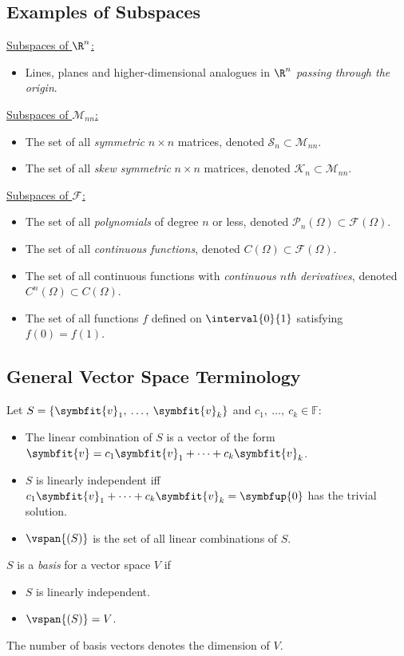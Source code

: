\documentclass{article}
\begin{document}
\begin{multicols*}{3}
    \subsection{Examples of Subspaces}
    \underline{Subspaces of \(\R^n\):}
    \begin{itemize}
        \item Lines, planes and higher-dimensional analogues in \(\R^n\) \emph{passing through the origin}.
    \end{itemize}
    \underline{Subspaces of \(\mathscr{M}_{nn}\):}
    \begin{itemize}
        \item The set of all \emph{symmetric} \(n \times n\) matrices, denoted \(\mathscr{S}_n \subset \mathscr{M}_{nn}\).
        \item The set of all \emph{skew symmetric} \(n \times n\) matrices, denoted \(\mathscr{K}_n \subset \mathscr{M}_{nn}\).
    \end{itemize}
    \underline{Subspaces of \(\mathscr{F}\):}
    \begin{itemize}
        \item The set of all \emph{polynomials} of degree \(n\) or less, denoted \(\mathscr{P}_n\left( \Omega \right) \subset \mathscr{F}\left( \Omega \right)\).
        \item The set of all \emph{continuous functions}, denoted \(C\left( \Omega \right) \subset \mathscr{F}\left( \Omega \right)\).
        \item The set of all continuous functions with \emph{continuous \(n\)th derivatives}, denoted \(C^n\left( \Omega \right) \subset C\left( \Omega \right)\).
        \item The set of all functions \(f\) defined on \(\interval{0}{1}\) satisfying \(f\left( 0 \right) = f\left( 1 \right)\).
    \end{itemize}
    \subsection{General Vector Space Terminology}
    Let \(S = \left\{ \symbfit{v}_1,\: \dots,\: \symbfit{v}_k \right\}\) and \(c_1,\: \dots,\: c_k \in \mathbb{F}\):
    \begin{itemize}
        \item The linear combination of \(S\)
              is a vector of the form \(\symbfit{v} = c_1 \symbfit{v}_1 + \cdots + c_k \symbfit{v}_k\).
        \item \(S\) is linearly independent iff
              \(c_1 \symbfit{v}_1 + \cdots + c_k \symbfit{v}_k = \symbfup{0}\) has the trivial solution.
        \item \(\vspan{\left( S \right)}\) is the set of all linear combinations of \(S\).
    \end{itemize}
    \(S\) is a \textit{basis} for a vector space \(V\) if
    \begin{itemize}
        \item \(S\) is linearly independent.
        \item \(\vspan{\left( S \right)} = V\).
    \end{itemize}
    The number of basis vectors denotes the dimension of \(V\).


\end{multicols*}
\end{document}
